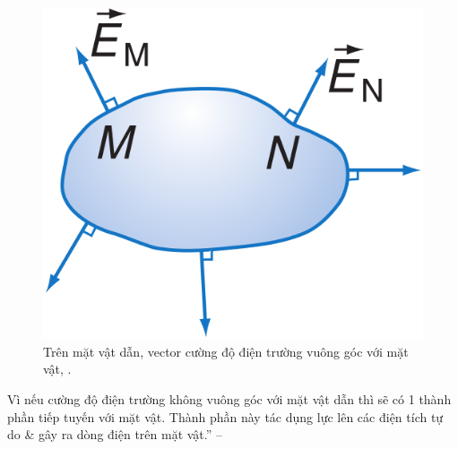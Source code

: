 \documentclass[oneside]{book}
\numberwithin{equation}{section}
\begin{document}
\begin{figure}[H]
	\centering
	\includegraphics[scale=0.15]{cuong_do_dien_truong_tren_mat_vat_dan}
	\caption{Trên mặt vật dẫn, vector cường độ điện trường vuông góc với mặt vật, \cite[Hình 6.1, p. 28]{SGK_Vat_Ly_11_nang_cao}.}
	\label{fig:cuong_do_dien_truong_tren_mat_vat_dan}
\end{figure}
Vì nếu cường độ điện trường không vuông góc với mặt vật dẫn thì sẽ có 1 thành phần tiếp tuyến với mặt vật. Thành phần này tác dụng lực lên các điện tích tự do \& gây ra dòng điện trên mặt vật.'' -- \cite[p. 28]{SGK_Vat_Ly_11_nang_cao}
\end{document}
